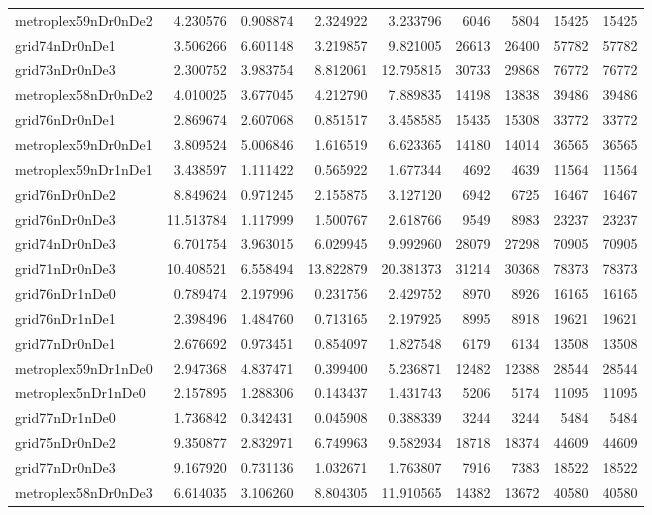 \begin{longtable}{|l|r|r|r|r|r|r|r|r|}
metroplex59nDr0nDe2 & 4.230576 & 0.908874 & 2.324922 & 3.233796 & 6046 & 5804 & 15425 & 15425 \\
grid74nDr0nDe1 & 3.506266 & 6.601148 & 3.219857 & 9.821005 & 26613 & 26400 & 57782 & 57782 \\
grid73nDr0nDe3 & 2.300752 & 3.983754 & 8.812061 & 12.795815 & 30733 & 29868 & 76772 & 76772 \\
metroplex58nDr0nDe2 & 4.010025 & 3.677045 & 4.212790 & 7.889835 & 14198 & 13838 & 39486 & 39486 \\
grid76nDr0nDe1 & 2.869674 & 2.607068 & 0.851517 & 3.458585 & 15435 & 15308 & 33772 & 33772 \\
metroplex59nDr0nDe1 & 3.809524 & 5.006846 & 1.616519 & 6.623365 & 14180 & 14014 & 36565 & 36565 \\
metroplex59nDr1nDe1 & 3.438597 & 1.111422 & 0.565922 & 1.677344 & 4692 & 4639 & 11564 & 11564 \\
grid76nDr0nDe2 & 8.849624 & 0.971245 & 2.155875 & 3.127120 & 6942 & 6725 & 16467 & 16467 \\
grid76nDr0nDe3 & 11.513784 & 1.117999 & 1.500767 & 2.618766 & 9549 & 8983 & 23237 & 23237 \\
grid74nDr0nDe3 & 6.701754 & 3.963015 & 6.029945 & 9.992960 & 28079 & 27298 & 70905 & 70905 \\
grid71nDr0nDe3 & 10.408521 & 6.558494 & 13.822879 & 20.381373 & 31214 & 30368 & 78373 & 78373 \\
grid76nDr1nDe0 & 0.789474 & 2.197996 & 0.231756 & 2.429752 & 8970 & 8926 & 16165 & 16165 \\
grid76nDr1nDe1 & 2.398496 & 1.484760 & 0.713165 & 2.197925 & 8995 & 8918 & 19621 & 19621 \\
grid77nDr0nDe1 & 2.676692 & 0.973451 & 0.854097 & 1.827548 & 6179 & 6134 & 13508 & 13508 \\
metroplex59nDr1nDe0 & 2.947368 & 4.837471 & 0.399400 & 5.236871 & 12482 & 12388 & 28544 & 28544 \\
metroplex5nDr1nDe0 & 2.157895 & 1.288306 & 0.143437 & 1.431743 & 5206 & 5174 & 11095 & 11095 \\
grid77nDr1nDe0 & 1.736842 & 0.342431 & 0.045908 & 0.388339 & 3244 & 3244 & 5484 & 5484 \\
grid75nDr0nDe2 & 9.350877 & 2.832971 & 6.749963 & 9.582934 & 18718 & 18374 & 44609 & 44609 \\
grid77nDr0nDe3 & 9.167920 & 0.731136 & 1.032671 & 1.763807 & 7916 & 7383 & 18522 & 18522 \\
metroplex58nDr0nDe3 & 6.614035 & 3.106260 & 8.804305 & 11.910565 & 14382 & 13672 & 40580 & 40580 \\

\end{longtable}
